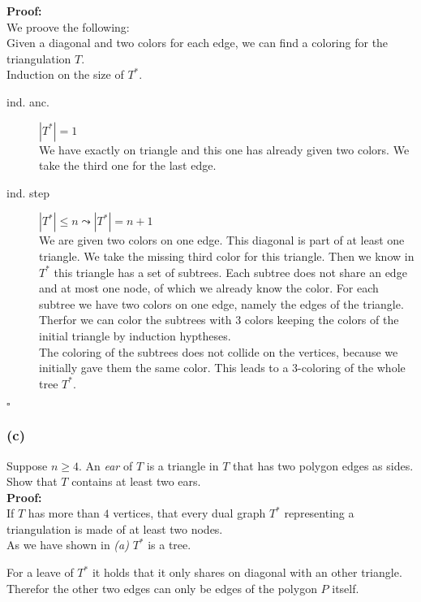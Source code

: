 \documentclass[11pt,a4paper,ngerman]{article}
\begin{document}
\textbf{Proof:}\\

We proove the following:\\
Given a diagonal and two colors for each edge, we can find a coloring for the triangulation $T$.\\
Induction on the size of $T^*$.
\begin{description}
    \item[ind. anc.] $|T^*| = 1$\\
        We have exactly on triangle and this one has already given two colors. We take the third one
        for the last edge.
    \item[ind. step] $|T^*| \leq n \leadsto |T^*| = n+1$\\
        We are given two colors on one edge. This diagonal is part of at least one triangle. We take the missing
        third color for this triangle. Then we know in $T^*$ this triangle has a set of subtrees. Each subtree does not share
        an edge and at most one node, of which we already know the color. For each subtree we have two colors on one edge, namely
        the edges of the triangle. Therfor we can color the subtrees with 3 colors keeping the colors of the initial triangle
        by induction hyptheses.\\

        The coloring of the subtrees does not collide on the vertices,  because we initially gave them the same color.
        This leads to a 3-coloring of the whole tree $T^*$.
\end{description}
\mbox{}\hfill $\square$

\subsubsection*{(c)}

Suppose $n \geq 4$. An \emph{ear} of $T$ is a triangle in $T$ that has two polygon edges
as sides. Show that $T$ contains at least two ears.\\

\textbf{Proof:}\\

If $T$ has more than $4$ vertices, that every dual graph $T^*$ representing 
a triangulation is made of at least two nodes.\\
As we have shown in \emph{(a)} $T^*$ is a tree.

For a leave of $T^*$ it holds that it only shares on diagonal with an other triangle.
Therefor the other two edges can only be edges of the polygon $P$ itself.
\end{document}
